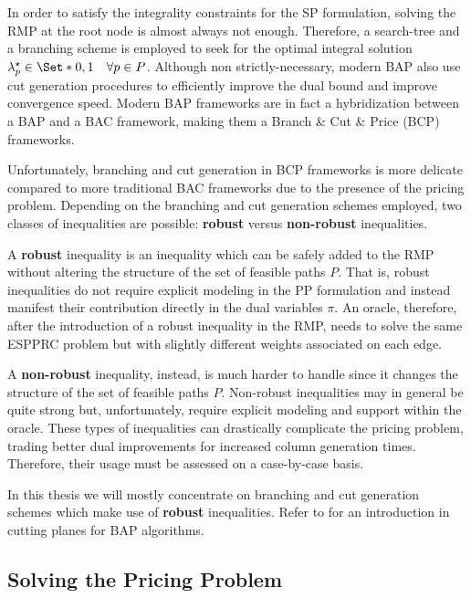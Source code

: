 In order to satisfy the integrality constraints for the SP formulation, solving the RMP at the root node
is almost always not enough.
Therefore, a search-tree and a branching scheme is employed to seek for the optimal integral solution $\lambda^\star_p \in \Set*{0, 1} \quad \forall p \in P$.
Although non strictly-necessary, modern BAP also use cut generation procedures to efficiently improve the dual bound and improve convergence speed.
Modern BAP frameworks are in fact a hybridization between a BAP and a BAC framework, making them a Branch \& Cut \& Price (BCP) frameworks.

\medskip

Unfortunately, branching and cut generation in BCP frameworks is more delicate compared to more traditional BAC frameworks due to the presence of the pricing problem.
Depending on the branching and cut generation schemes employed, two classes of inequalities are possible: \textbf{robust} versus \textbf{non-robust} inequalities.

A \textbf{robust} inequality is an inequality which can be safely added to the RMP without altering the structure of the set of feasible paths $P$.
That is, robust inequalities do not require explicit modeling in the PP formulation and instead manifest their contribution directly in the dual variables $\pi$.
An oracle, therefore, after the introduction of a robust inequality in the RMP, needs to solve the same ESPPRC problem but with slightly different weights associated on each edge.

A \textbf{non-robust} inequality, instead, is much harder to handle since it changes the structure of the set of feasible paths $P$.
Non-robust inequalities may in general be quite strong but, unfortunately, require explicit modeling and support within the oracle.
These types of inequalities can drastically complicate the pricing problem, trading better dual improvements for increased column generation times.
Therefore, their usage must be assessed on a case-by-case basis.


In this thesis we will mostly concentrate on branching and cut generation schemes which make use of \textbf{robust} inequalities.
Refer to \textcite{desaulniers2011} for an introduction in cutting planes for BAP algorithms.

\subsection{Solving the Pricing Problem}
\label{sec:intro-solving-the-pricing-problem}

